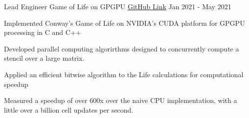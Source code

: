 

\begin{cventries}

  \cventry
    {Lead Engineer} %
    {Game of Life on GPGPU} %
    {\href{https://github.com/nbarrios1337/bitwise-GoL-GPGPU}{GitHub Link}} %
    {Jan 2021 - May 2021} %
    {
      \begin{cvitems} %
        \item Implemented Conway's Game of Life on NVIDIA's CUDA platform for GPGPU processing in C and C++
        \item Developed parallel computing algorirthms designed to concurrently compute a stencil over a large matrix.
        \item Applied an efficient bitwise algorithm to the Life calculations for computational speedup
        \item Measured a speedup of over 600x over the naive CPU implementation, with a little over a billion cell updates per second.
      \end{cvitems}
    }



\end{cventries}
